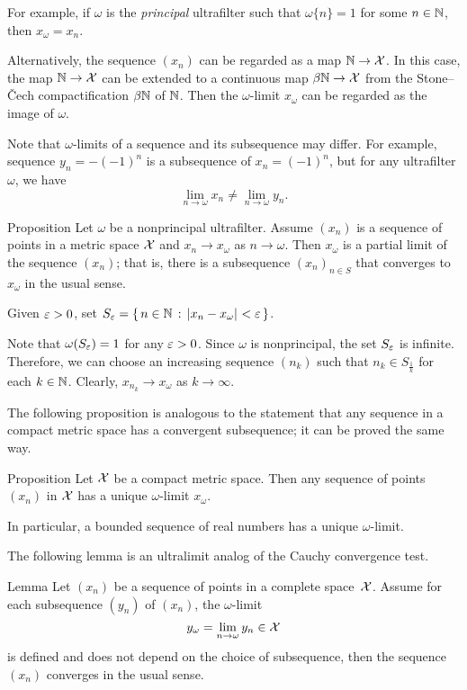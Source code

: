 For example, if $\omega$ is the {}\emph{principal} ultrafilter such that $\omega\{n\}=1$ for some $n\in\mathbb{N}$, then
$x_\omega=x_n$.

Alternatively, the sequence $(x_n)$ can be regarded as a map $\mathbb{N}\to\mathcal{X}$.
In this case, the map $\mathbb{N}\to\mathcal{X}$ can be extended to a continuous map $\beta\mathbb{N}\to\mathcal{X}$ from the Stone--\v{C}ech compactification $\beta\mathbb{N}$ of $\mathbb{N}$.
Then the $\omega$-limit $x_\omega$ can be regarded as the image of $\omega$.

Note that $\omega$-limits of a sequence and its subsequence may differ.
For example, sequence $y_n=-(-1)^n$ is a subsequence of $x_n=(-1)^n$, but for any ultrafilter $\omega$, we have
\[\lim_{n\to\omega}x_n
\ne
\lim_{n\to\omega}y_n.\] 

\begin{thm}{Proposition}\label{prop:ultra/partial}
Let $\omega$ be a nonprincipal ultrafilter.
Assume $(x_n)$ is a sequence of points in a metric space $\mathcal{X}$
and $x_n\to  x_\omega$ as $n\to\omega$.
Then $x_\omega$ is a partial limit of the sequence $(x_n)$;
that is, there is a subsequence $(x_n)_{n\in S}$ that converges to $x_\omega$ in the usual sense.
\end{thm}

Given $\varepsilon>0$, 
set $S_\eps=\set{n\in\NN}{\dist{x_n}{x_\omega}{}<\eps}$.

Note that $\omega(S_\varepsilon)=1$ for any $\varepsilon>0$.
Since $\omega$ is nonprincipal, the set $S_\varepsilon$ is infinite.
Therefore, we can choose an increasing sequence $(n_k)$
such that $n_k\in S_{\frac1k}$ for each $k\in \mathbb{N}$.
Clearly, $x_{n_k}\to x_\omega$ as $k\to\infty$.
\qeds

The following proposition 
is analogous to the statement that any sequence in a compact metric space 
has a convergent subsequence;
it can be proved the same way.

\begin{thm}{Proposition}\label{prop:ultra/compact}
Let $\mathcal{X}$ be a compact metric space.
Then
any sequence of points $(x_n)$ in $\mathcal{X}$ has a unique $\omega$-limit $x_\omega$.

In particular, a bounded sequence of real numbers has a unique $\omega$-limit.
\end{thm}

The following lemma is an ultralimit analog of the Cauchy convergence test.

\begin{thm}{Lemma}\label{lem:X-X^w}
Let $(x_n)$ be a sequence of points in a complete space~$\mathcal{X}$. 
Assume for each subsequence $(y_n)$ of $(x_n)$, 
the $\omega$-limit 
\[y_\omega=\lim_{n\to\omega}y_{n}\in \mathcal{X}\]
is defined and does not depend on the choice of subsequence, 
then the sequence $(x_n)$ converges in the usual sense.
\end{thm}

